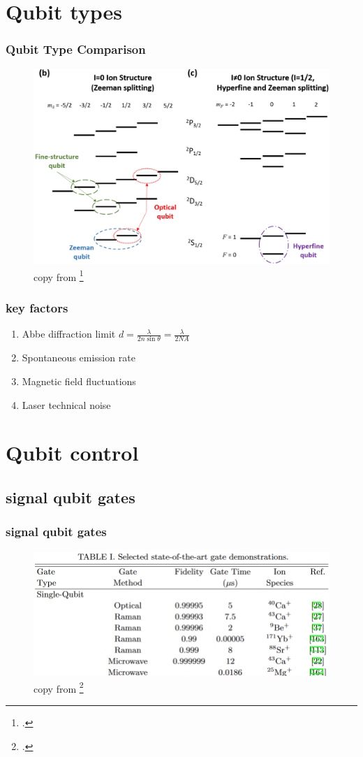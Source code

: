 \documentclass[18 pt]{beamer}
\begin{document}
\section{Qubit types}
\begin{frame}{}
  \frametitle{Qubit Type Comparison}
  \begin{figure}
    \includegraphics[width=.8\textwidth]{qubit.png}
    \caption{copy from \footcite{https://arxiv.org/abs/1904.04178}}
  \end{figure}
\end{frame}
\begin{frame}
  \frametitle{key factors}
  \begin{enumerate}
    \item Abbe diffraction limit \(d = \frac{\lambda}{2n\sin\theta}=\frac{\lambda}{2NA}\)
    \item Spontaneous emission rate
    \item Magnetic field fluctuations
    \item Laser technical noise
  \end{enumerate}
\end{frame}
\section{Qubit control}
\subsection{signal qubit gates}
\begin{frame}
  \frametitle{signal qubit gates}
  \begin{figure}
    \includegraphics[width=.8\textwidth]{singal-gate.png}
    \caption{copy from \footcite{https://arxiv.org/abs/1904.04178}}
  \end{figure}
\end{frame}
\end{document}
